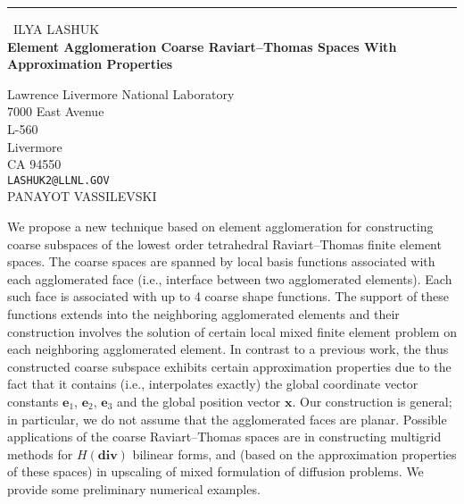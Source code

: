 \documentclass{report}
\begin{document}
\begin{center}
\rule{6in}{1pt} \
{\large ILYA LASHUK \\
{\bf Element Agglomeration Coarse Raviart--Thomas Spaces With Approximation Properties}}

Lawrence Livermore National Laboratory \\ 7000 East Avenue \\ L-560 \\ Livermore \\ CA 94550
\\
{\tt LASHUK2@LLNL.GOV}\\
PANAYOT VASSILEVSKI\end{center}

We propose a new technique based on element agglomeration for
constructing coarse subspaces of the lowest order tetrahedral
Raviart--Thomas finite element spaces. The coarse spaces are spanned by
local basis functions associated with each agglomerated face (i.e.,
interface between two agglomerated elements). Each such face is
associated with up to 4 coarse shape functions. The support of these
functions extends into the neighboring agglomerated elements and their
construction involves the solution of certain local mixed finite element
problem on each neighboring agglomerated element. In contrast to a
previous work, the thus constructed coarse subspace exhibits certain
approximation properties due to the fact that it contains (i.e.,
interpolates exactly) the global coordinate vector constants
$\mathbf{e}_1$, $\mathbf{e}_2$, $\mathbf{e}_3$ and the global position
vector $\mathbf{x}$. Our construction is general; in particular, we do
not assume that the agglomerated faces are planar. Possible applications
of the coarse Raviart--Thomas spaces are in constructing multigrid
methods for $H(\mathbf{div})$ bilinear forms, and (based on the
approximation properties of these spaces) in upscaling of mixed
formulation of diffusion problems. We provide some preliminary numerical
examples.
\end{document}
